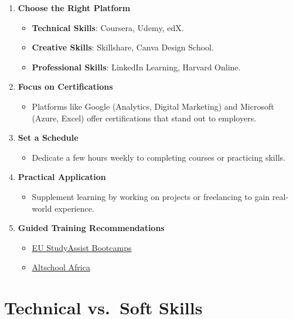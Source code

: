 \documentclass[
  letterpaper,
  DIV=11,
  numbers=noendperiod]{scrreprt}
\providecommand{\tightlist}{%
  \setlength{\itemsep}{0pt}\setlength{\parskip}{0pt}}\usepackage{longtable,booktabs,array}
\begin{document}
\begin{enumerate}
\def\labelenumi{\arabic{enumi}.}
\item
  \textbf{Choose the Right Platform}

  \begin{itemize}
  \tightlist
  \item
    \textbf{Technical Skills}: Coursera, Udemy, edX.
  \item
    \textbf{Creative Skills}: Skillshare, Canva Design School.
  \item
    \textbf{Professional Skills}: LinkedIn Learning, Harvard Online.
  \end{itemize}
\item
  \textbf{Focus on Certifications}

  \begin{itemize}
  \tightlist
  \item
    Platforms like Google (Analytics, Digital Marketing) and Microsoft
    (Azure, Excel) offer certifications that stand out to employers.
  \end{itemize}
\item
  \textbf{Set a Schedule}

  \begin{itemize}
  \tightlist
  \item
    Dedicate a few hours weekly to completing courses or practicing
    skills.
  \end{itemize}
\item
  \textbf{Practical Application}

  \begin{itemize}
  \tightlist
  \item
    Supplement learning by working on projects or freelancing to gain
    real-world experience.
  \end{itemize}
\item
  \textbf{Guided Training Recommendations}

  \begin{itemize}
  \tightlist
  \item
    \href{https://www.eustudyassist.com/courses}{EU StudyAssist
    Bootcamps}
  \item
    \href{https://altschoolafrica.com/}{Altschool Africa}
  \end{itemize}
\end{enumerate}

\section{Technical vs.~Soft Skills}\label{technical-vs.-soft-skills}
\end{document}
